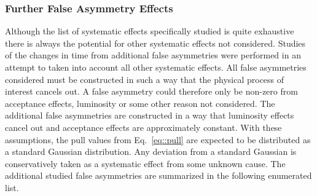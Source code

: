\subsubsection{Further False Asymmetry Effects}
Although the list of systematic effects specifically studied is quite exhaustive
there is always the potential for other systematic effects not considered.
Studies of the changes in time from additional false asymmetries were performed
in an attempt to taken into account all other systematic effects.  All false
asymmetries considered must be constructed in such a way that the physical
process of interest cancels out.  A false asymmetry could therefore only be
non-zero from acceptance effects, luminosity or some other reason not
considered.  The additional false asymmetries are constructed in a way that
luminosity effects cancel out and acceptance effects are approximately constant.
With these assumptions, the pull values from Eq.~\ref{eq::pull} are expected to
be distributed as a standard Gaussian distribution.  Any deviation from a
standard Gaussian is conservatively taken as a systematic effect from some
unknown cause.  The additional studied false asymmetries are summarized in the
following enumerated list.

